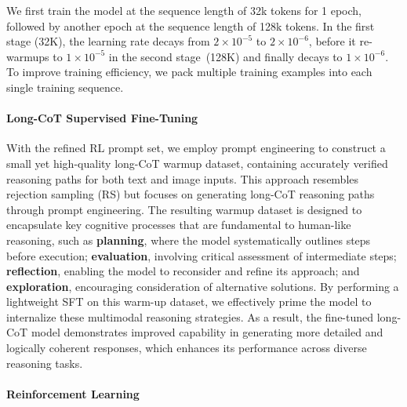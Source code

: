 \documentclass{article}
\begin{document}
We first train the model at the sequence length of 32k tokens for 1 epoch, followed by another epoch at the sequence length of 128k tokens. In the first stage (32K), the learning rate decays from $2\times10^{-5}$ to $2\times10^{-6}$, before it re-warmups to $1\times10^{-5}$ in the second stage~(128K) and finally decays to $1\times10^{-6}$. To improve training efficiency, we pack multiple training examples into each single training sequence.

\paragraph{Long-CoT Supervised Fine-Tuning}

\label{sec:long_cot_sft}

With the refined RL prompt set, we employ prompt engineering to construct a small yet high-quality long-CoT warmup dataset, containing accurately verified reasoning paths for both text and image inputs. 
This approach resembles rejection sampling (RS) but focuses on generating long-CoT reasoning paths through prompt engineering. 
The resulting warmup dataset is designed to encapsulate key cognitive processes that are fundamental to human-like reasoning, such as \textbf{planning}, where the model systematically outlines steps before execution; \textbf{evaluation}, involving critical assessment of intermediate steps; \textbf{reflection}, enabling the model to reconsider and refine its approach; and \textbf{exploration}, encouraging consideration of alternative solutions.
By performing a lightweight SFT on this warm-up dataset, we effectively prime the model to internalize these multimodal reasoning strategies. As a result, the fine-tuned long-CoT model demonstrates improved capability in generating more detailed and logically coherent responses, which enhances its performance across diverse reasoning tasks.


\paragraph{Reinforcement Learning}
\end{document}
